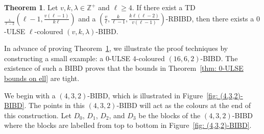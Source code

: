 \documentclass[12pt]{article}
\theoremstyle{definition}
\newtheorem{theorem}{Theorem}[section]
\begin{document}
\begin{theorem}\label{thm: general construction for nice 0-LSE l-coloured BIBDs}
    Let $v,k,\lambda \in \mathbb{Z}^+$ and $\ell\geq 4$. If there exist a TD$_{\frac{\lambda}{\ell-2}}\left(\ell-1, \frac{v(\ell-1)}{k\ell}\right)$ and a $\left(\frac{v}{\ell}, \frac{k}{\ell-1}, \frac{k\ell(\ell-2)}{v(\ell-1)}\right)$-RBIBD, then there exists a $0$-ULSE $\ell$-coloured $(v,k,\lambda)$-BIBD.
\end{theorem}

In advance of proving Theorem~\ref{thm: general construction for nice 0-LSE l-coloured BIBDs}, we illustrate the proof techniques by constructing a small example: a $0$-ULSE $4$-coloured $(16,6,2)$-BIBD. The existence of such a BIBD proves that the bounds in Theorem~\ref{thm: 0-ULSE bounds on ell} are tight.

We begin with a $(4,3,2)$-BIBD, which is illustrated in Figure~\ref{fig: (4,3,2)-BIBD}. The points in this $(4,3,2)$-BIBD will act as the colours at the end of this construction. Let $D_0$, $D_1$, $D_2$, and $D_3$ be the blocks of the $(4,3,2)$-BIBD where the blocks are labelled from top to bottom in Figure~\ref{fig: (4,3,2)-BIBD}.
\end{document}
